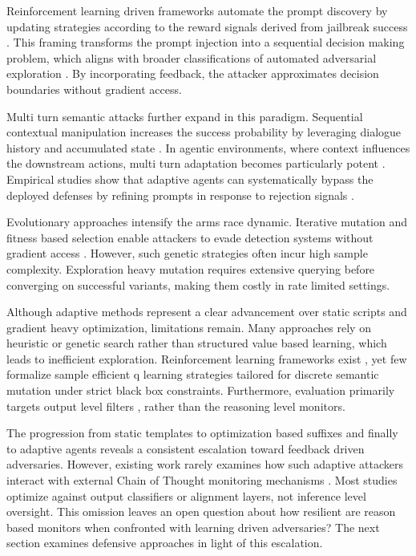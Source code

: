 \documentclass[conference]{IEEEtran}
\begin{document}
Reinforcement learning driven frameworks automate the prompt discovery by updating strategies according to the reward signals derived from jailbreak success \cite{b14}. This framing transforms the prompt injection into a sequential decision making problem, which aligns with broader classifications of automated adversarial exploration \cite{b2}. By incorporating feedback, the attacker approximates decision boundaries without gradient access.

Multi turn semantic attacks further expand in this paradigm. Sequential contextual manipulation increases the success probability by leveraging dialogue history and accumulated state \cite{b15}. In agentic environments, where context influences the downstream actions, multi turn adaptation becomes particularly potent \cite{b3,b4}. Empirical studies show that adaptive agents can systematically bypass the deployed defenses by refining prompts in response to rejection signals \cite{b16}.

Evolutionary approaches intensify the arms race dynamic. Iterative mutation and fitness based selection enable attackers to evade detection systems without gradient access \cite{b13}. However, such genetic strategies often incur high sample complexity. Exploration heavy mutation requires extensive querying before converging on successful variants, making them costly in rate limited settings.


Although adaptive methods represent a clear advancement over static scripts and gradient heavy optimization, limitations remain. Many approaches rely on heuristic or genetic search rather than structured value based learning, which leads to inefficient exploration. Reinforcement learning frameworks exist \cite{b14}, yet few formalize sample efficient q learning strategies tailored for discrete semantic mutation under strict black box constraints. Furthermore, evaluation primarily targets output level filters \cite{b17,b18}, rather than the reasoning level monitors.

The progression from static templates to optimization based suffixes and finally to adaptive agents reveals a consistent escalation toward feedback driven adversaries. However, existing work rarely examines how such adaptive attackers interact with external Chain of Thought monitoring mechanisms \cite{b6,b23}. Most studies optimize against output classifiers or alignment layers, not inference  level oversight. This omission leaves an open question about how resilient are reason based monitors when confronted with learning driven adversaries? The next section examines defensive approaches in light of this escalation.
\end{document}

